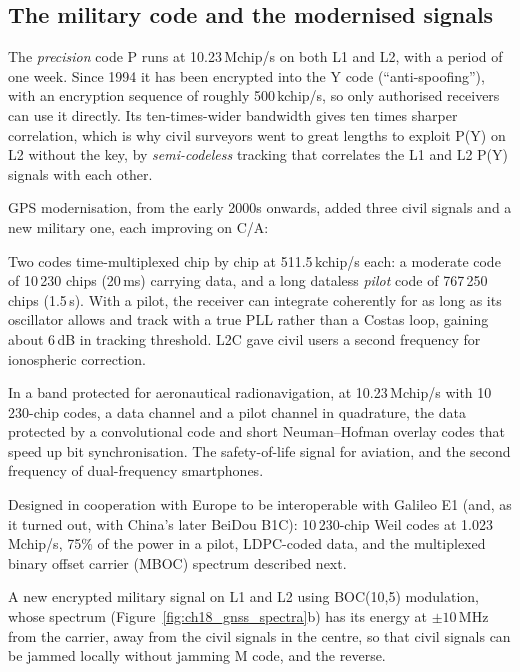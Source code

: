 
\subsection{The military code and the modernised signals}

The \emph{precision} code P runs at 10.23\,Mchip/s on both L1 and L2, with a period of one
week. Since 1994 it has been encrypted into the Y code (``anti-spoofing''), with an
encryption sequence of roughly 500\,kchip/s, so only authorised receivers can use it directly.
Its ten-times-wider bandwidth gives ten times sharper correlation, which is why civil
surveyors went to great lengths to exploit P(Y) on L2 without the key, by
\emph{semi-codeless} tracking that correlates the L1 and L2 P(Y) signals with each other.

GPS modernisation, from the early 2000s onwards, added three civil signals and a new military
one, each improving on C/A:
\begin{description}[style=nextline,leftmargin=1.2em,font=\sffamily\bfseries\small\color{navy}]
\item[L2C (1227.60\,MHz).] Two codes time-multiplexed chip by chip at 511.5\,kchip/s each: a
moderate code of 10\,230 chips (20\,ms) carrying data, and a long dataless \emph{pilot} code of
767\,250 chips (1.5\,s). With a pilot, the receiver can integrate coherently for as long as its
oscillator allows and track with a true PLL rather than a Costas loop, gaining about 6\,dB in
tracking threshold. L2C gave civil users a second frequency for ionospheric correction.
\item[L5 (1176.45\,MHz).] In a band protected for aeronautical radionavigation, at
10.23\,Mchip/s with 10\,230-chip codes, a data channel and a pilot channel in quadrature, the
data protected by a convolutional code and short Neuman--Hofman overlay codes that speed up
bit synchronisation. The safety-of-life signal for aviation, and the second frequency of
dual-frequency smartphones.
\item[L1C (1575.42\,MHz).] Designed in cooperation with Europe to be interoperable with Galileo
E1 (and, as it turned out, with China's later BeiDou B1C): 10\,230-chip Weil codes at
1.023\,Mchip/s, 75\% of the power in a pilot, LDPC-coded data, and the multiplexed binary offset
carrier (MBOC) spectrum described next.
\item[M code.] A new encrypted military signal on L1 and L2 using BOC(10,5) modulation, whose
spectrum (Figure~\ref{fig:ch18_gnss_spectra}b) has its energy at $\pm10$\,MHz from the
carrier, away from the civil signals in the centre, so that civil signals can be jammed
locally without jamming M code, and the reverse.
\end{description}

